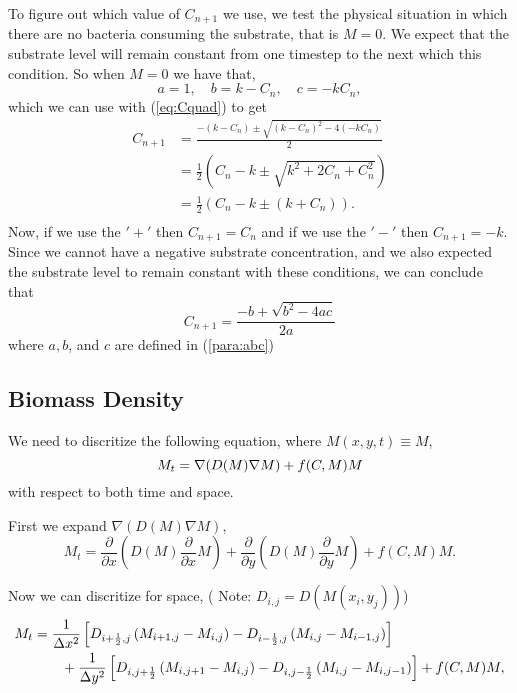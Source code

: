   To figure out which value of $C_{n+1}$ we use, we test the physical situation in which there are no bacteria consuming the substrate, that is $M= 0$. We expect that the substrate level will remain constant from one timestep to the next which this condition. So when $M = 0$ we have that,
  \begin{equation}
    a = 1, \quad b = k - C_n, \quad c = -k C_n,
  \end{equation} 
  which we can use with (\ref{eq:Cquad}) to get
  \begin{equation} \begin{aligned}
    C_{n+1} &= \frac{- (k - C_n) \pm \sqrt{(k - C_n)^2 - 4 (-k C_n)}}{2} \\
      &= \frac{1}{2} \left( C_n - k \pm \sqrt{k^2 + 2 C_n + C_n^2}\right) \\
      &= \frac{1}{2} \left( C_n - k \pm (k+C_n) \right). \\
  \end{aligned} \end{equation}
  Now, if we use the $'+'$ then $C_{n+1} = C_n$ and if we use the $'-'$ then $C_{n+1} = -k$. Since we cannot have a negative substrate concentration, and we also expected the substrate level to remain constant with these conditions, we can conclude that
  \begin{equation}
    C_{n+1} = \frac{-b + \sqrt{b^2 - 4ac}}{2a}
  \end{equation} 
  where $a,b$, and $c$ are defined in (\ref{para:abc})


\subsection{Biomass Density}
  We need to discritize the following equation, where $M(x,y,t) \equiv M$,
  \begin{equation}
    M_t = \nabla (D(M) \nabla M) + f(C,M) M \\
  \end{equation}
  with respect to both time and space.
  
  First we expand $\nabla(D(M)\nabla M)$,
  \begin{equation}
    M_t = \frac{\partial}{\partial x} \left( D(M) \frac{\partial}{\partial x} M \right) + \frac{\partial}{\partial y} \left( D(M) \frac{\partial}{\partial y} M \right) + f(C,M) M.
  \end{equation}
  
  Now we can discritize for space, (  Note: $D_{i,j} = D(M(x_i,y_j))$) 
  \begin{align}
    M_t &= \frac{1}{\Delta x ^2} \left[ D_{i+\frac{1}{2},j} \left( M_{i+1,j} - M_{i,j}  \right)  - D_{i-\frac{1}{2},j} \left( M_{i,j} - M_{i-1,j}  \right) \right] \\
    &\qquad + \frac{1}{\Delta y ^2} \left[ D_{i,j+\frac{1}{2}} \left( M_{i,j+1} - M_{i,j}  \right)  - D_{i,j-\frac{1}{2}} \left( M_{i,j} - M_{i,j-1}  \right) \right] + f(C,M) M, \notag
  \end{align}

